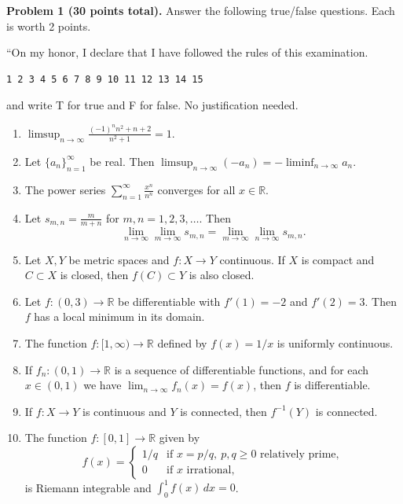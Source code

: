 \documentclass[12pt]{article}
\begin{document}
\vspace{1em}

\noindent\textbf{Problem 1 (30 points total).} Answer the following true/false questions. Each is worth 2 points. 

\vspace{1em}
“On my honor, I declare that I have followed the rules of this examination.
\begin{verbatim}
1 2 3 4 5 6 7 8 9 10 11 12 13 14 15
\end{verbatim}
and write T for true and F for false. No justification needed.

\medskip
\begin{enumerate}[label=\textbf{(T / F) \arabic*.}, leftmargin=*]
  \item $\displaystyle\limsup_{n\to\infty}\frac{(-1)^n n^2 + n + 2}{n^2 + 1}=1$.
  \item Let $\{a_n\}_{n=1}^\infty$ be real. Then $\limsup_{n\to\infty}(-a_n) = -\liminf_{n\to\infty}a_n$.
  \item The power series $\displaystyle\sum_{n=1}^\infty \frac{x^n}{n^n}$ converges for all $x\in\mathbb{R}$.
  \item Let $s_{m,n}=\frac{m}{m+n}$ for $m,n=1,2,3,\dots$. Then
    \[ \lim_{n\to\infty}\lim_{m\to\infty}s_{m,n} = \lim_{m\to\infty}\lim_{n\to\infty}s_{m,n}. \]
  \item Let $X,Y$ be metric spaces and $f:X\to Y$ continuous. If $X$ is compact and $C\subset X$ is closed, then $f(C)\subset Y$ is also closed.
  \item Let $f:(0,3)\to\mathbb{R}$ be differentiable with $f'(1)=-2$ and $f'(2)=3$. Then $f$ has a local minimum in its domain.
  \item The function $f:[1,\infty)\to\mathbb{R}$ defined by $f(x)=1/x$ is uniformly continuous.
  \item If $f_n:(0,1)\to\mathbb{R}$ is a sequence of differentiable functions, and for each $x\in(0,1)$ we have $\lim_{n\to\infty}f_n(x)=f(x)$, then $f$ is differentiable.
  \item If $f:X\to Y$ is continuous and $Y$ is connected, then $f^{-1}(Y)$ is connected.
  \item The function $f:[0,1]\to\mathbb{R}$ given by
    \[ f(x)=\begin{cases}1/q &\text{if }x=p/q,\ p,q\ge0\text{ relatively prime},\\0 &\text{if }x \text{ irrational},\end{cases} \]
    is Riemann integrable and $\displaystyle\int_0^1 f(x)\,dx=0$.

\end{enumerate}
\end{document}
